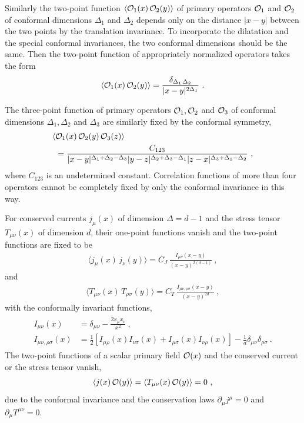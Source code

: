 Similarly the two-point function $\langle {\cal O}_1(x)\,{\cal O}_2(y)\rangle$ of primary operators ${\cal O}_1$ and ${\cal O}_2$ of conformal dimensions $\Delta_1$ and $\Delta_2$ depends only on the distance $|x-y|$ between the two points by the translation invariance. 
To incorporate the dilatation and the special conformal invariances, the two conformal dimensions should be the same. 
Then the two-point function of appropriately normalized operators takes the form
\begin{align}\label{TwoPnt}
	\langle {\cal O}_1(x)\,{\cal O}_2(y)\rangle = \frac{\delta_{\Delta_1\, \Delta_2}}{|x-y|^{2\Delta_1}}  \ .
\end{align}

The three-point function of primary operators ${\cal O}_1, {\cal O}_2$ and ${\cal O}_3$ of conformal dimensions $\Delta_1, \Delta_2$ and $\Delta_3$ are similarly fixed by the conformal symmetry,
\begin{align}
\begin{aligned}
	\langle &{\cal O}_1(x)\,{\cal O}_2(y) \, {\cal O}_3(z)\rangle \\
	&= \frac{C_{123}}{|x-y|^{\Delta_1 + \Delta_2 - \Delta_3}|y-z|^{\Delta_2 + \Delta_3 - \Delta_1}|z-x|^{\Delta_3 + \Delta_1 - \Delta_2}} \ ,
\end{aligned}
\end{align}
where $C_{123}$ is an undetermined constant.
Correlation functions of more than four operators cannot be completely fixed by only the conformal invariance in this way. 


For conserved currents $j_\mu(x)$ of dimension $\Delta=d-1$ and the stress tensor $T_{\mu\nu}(x)$ of dimension $d$, their one-point functions vanish and the two-point functions are fixed to be \cite{Osborn:1993cr,Erdmenger:1996yc}
\begin{align}\label{jjCor}
	\langle j_\mu(x)\, j_\nu(y) \rangle = C_J\, \frac{I_{\mu\nu}(x-y)}{(x-y)^{2(d-1)}} \ ,
\end{align}
and
\begin{align}\label{TTCor}
\langle T_{\mu\nu}(x)\,T_{\rho\sigma}(y)\rangle
	= C_T\, \frac{I_{\mu\nu,\rho\sigma}(x-y)}{(x-y)^{2d}} \ ,
\end{align}
with the conformally invariant functions,
\begin{align}
\begin{aligned}
I_{\mu\nu}(x) &= \delta_{\mu\nu} - \frac{2x_\mu x_\nu}{x^2} \ , \\
I_{\mu\nu,\rho\sigma}(x) &= \frac{1}{2}\left[ I_{\mu\rho}(x)I_{\nu\sigma}(x) +I_{\mu\sigma}(x)I_{\nu\rho}(x) \right] -\frac{1}{d}\delta_{\mu\nu}\delta_{\rho\sigma} \ .
\end{aligned}
\end{align}
The two-point functions of a scalar primary field ${\cal O}(x)$ and the conserved current or the stress tensor vanish,
\begin{align}\label{TO_CFT}
	\langle j(x)\, {\cal O}(y)\rangle = \langle T_{\mu\nu} (x)\, {\cal O}(y) \rangle = 0 \ ,
\end{align}
due to the conformal invariance and the conservation laws $\partial_\mu j^\mu = 0$ and $\partial_\mu T^{\mu\nu} = 0$.



